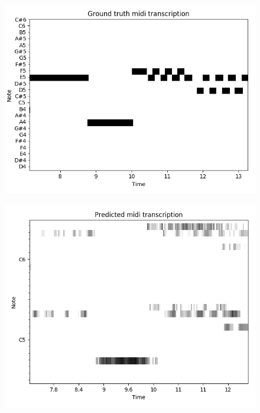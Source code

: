 \documentclass[unicode]{beamer}
\begin{document}
\begin{frame}
\begin{figure}
  \includegraphics[scale=.6]{res/organ-note-groundtruth-zoomed-for-presentation.png}
\end{figure}
\end{frame}

\begin{frame}
\begin{figure}
  \includegraphics[scale=.6]{res/organ-overfit-028-acoustic-zoomed-for-presentation.png}
\end{figure}
\end{frame}
\end{document}
